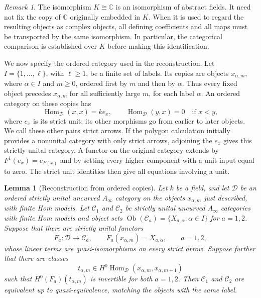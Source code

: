 \documentclass[11pt]{article}
\numberwithin{equation}{section}
\newtheorem{lemma}[theorem]{Lemma}
\theoremstyle{definition}
\theoremstyle{remark}
\newtheorem{remark}[theorem]{Remark}
\newcommand{\C}{\mathbb C}
\newcommand{\Hom}{\operatorname{Hom}}
\begin{document}
\begin{remark}
The isomorphism $K\cong\C$ is an isomorphism of abstract fields.  It need
not fix the copy of $\C$ originally embedded in $K$.  When it is used to
regard the resulting objects as complex objects, all defining
coefficients and all maps must be transported by the same isomorphism.
In particular, the categorical comparison is established over $K$
before making this identification.
\end{remark}

We now specify the ordered category used in the reconstruction.  Let
$I=\{1,\ldots,\ell\}$, with $\ell\ge1$, be a finite set of labels.  Its copies
are objects $x_{\alpha,m}$, where $\alpha\in I$ and $m\ge0$, ordered
first by $m$ and then by $\alpha$.  Thus every fixed object precedes
$x_{\alpha,m}$ for all sufficiently large $m$, for each label $\alpha$.
An ordered category on these copies has
\[
 \Hom_{\mathcal D}(x,x)=k e_x,
 \qquad
 \Hom_{\mathcal D}(y,x)=0\quad\text{if }x<y,
\]
where $e_x$ is its strict unit; its other morphisms go from earlier to
later objects.  We call these other pairs strict arrows.  If the polygon
calculation initially provides a nonunital category with only strict
arrows, adjoining the $e_x$ gives this strictly unital category.  A
functor on the original category extends by $F^1(e_x)=e_{F(x)}$ and by
setting every higher component with a unit input equal to zero.  The
strict unit identities then give all equations involving a unit.

\begin{lemma}[Reconstruction from ordered copies]
\label{lem:ordered-source-reconstruction}
Let $k$ be a field, and let $\mathcal D$ be an ordered strictly unital
uncurved $A_\infty$ category on the objects $x_{\alpha,m}$ just described,
with finite Hom models.  Let $\mathcal C_1$ and $\mathcal C_2$ be strictly
unital uncurved $A_\infty$ categories with finite Hom models and object
sets $\operatorname{Ob}(\mathcal C_a)=\{X_{a,\alpha}:\alpha\in I\}$
for $a=1,2$.
Suppose that there are strictly unital functors
\[
 F_a:\mathcal D\longrightarrow\mathcal C_a,
 \qquad F_a(x_{\alpha,m})=X_{a,\alpha},\qquad a=1,2,
\]
whose linear terms are quasi-isomorphisms on every strict arrow.
Suppose further that there are classes
\[
 t_{\alpha,m}\in
 H^0\Hom_{\mathcal D}(x_{\alpha,m},x_{\alpha,m+1})
\]
such that $H^0(F_a)(t_{\alpha,m})$ is invertible for both $a=1,2$.
Then $\mathcal C_1$ and $\mathcal C_2$ are equivalent up to
quasi-equivalence, matching the objects with the same label.
\end{lemma}
\end{document}
